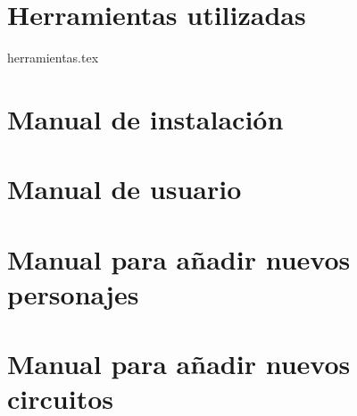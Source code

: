 \appendix
\chapter{Herramientas utilizadas}
 {herramientas.tex}
\chapter{Manual de instalación}

\chapter{Manual de usuario}

\chapter{Manual para añadir nuevos personajes}

\chapter{Manual para añadir nuevos circuitos}
%
